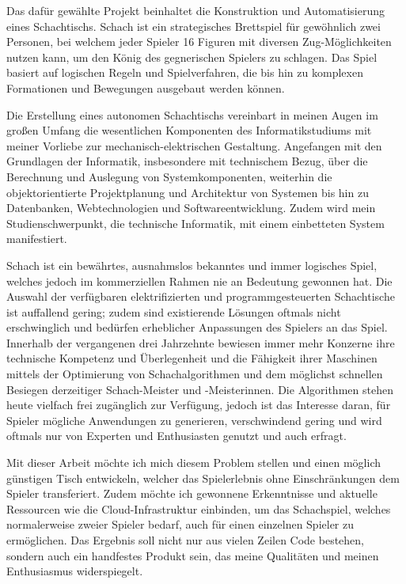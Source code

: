 Das dafür gewählte Projekt beinhaltet die Konstruktion und
Automatisierung eines Schachtischs. Schach ist ein strategisches
Brettspiel für gewöhnlich zwei Personen, bei welchem jeder Spieler 16
Figuren mit diversen Zug-Möglichkeiten nutzen kann, um den König des
gegnerischen Spielers zu schlagen. Das Spiel basiert auf logischen
Regeln und Spielverfahren, die bis hin zu komplexen Formationen und
Bewegungen ausgebaut werden können.

Die Erstellung eines autonomen Schachtischs vereinbart in meinen Augen
im großen Umfang die wesentlichen Komponenten des Informatikstudiums mit
meiner Vorliebe zur mechanisch-elektrischen Gestaltung. Angefangen mit
den Grundlagen der Informatik, insbesondere mit technischem Bezug, über
die Berechnung und Auslegung von Systemkomponenten, weiterhin die
objektorientierte Projektplanung und Architektur von Systemen bis hin zu
Datenbanken, Webtechnologien und Softwareentwicklung. Zudem wird mein
Studienschwerpunkt, die technische Informatik, mit einem einbetteten
System manifestiert.

Schach ist ein bewährtes, ausnahmslos bekanntes und immer logisches
Spiel, welches jedoch im kommerziellen Rahmen nie an Bedeutung gewonnen
hat. Die Auswahl der verfügbaren elektrifizierten und
programmgesteuerten Schachtische ist auffallend gering; zudem sind
existierende Lösungen oftmals nicht erschwinglich und bedürfen
erheblicher Anpassungen des Spielers an das Spiel. Innerhalb der
vergangenen drei Jahrzehnte bewiesen immer mehr Konzerne ihre technische
Kompetenz und Überlegenheit und die Fähigkeit ihrer Maschinen mittels
der Optimierung von Schachalgorithmen und dem möglichst schnellen
Besiegen derzeitiger Schach-Meister und -Meisterinnen. Die Algorithmen
stehen heute vielfach frei zugänglich zur Verfügung, jedoch ist das
Interesse daran, für Spieler mögliche Anwendungen zu generieren,
verschwindend gering und wird oftmals nur von Experten und Enthusiasten
genutzt und auch erfragt.

Mit dieser Arbeit möchte ich mich diesem Problem stellen und einen
möglich günstigen Tisch entwickeln, welcher das Spielerlebnis ohne
Einschränkungen dem Spieler transferiert. Zudem möchte ich gewonnene
Erkenntnisse und aktuelle Ressourcen wie die Cloud-Infrastruktur
einbinden, um das Schachspiel, welches normalerweise zweier Spieler
bedarf, auch für einen einzelnen Spieler zu ermöglichen. Das Ergebnis
soll nicht nur aus vielen Zeilen Code bestehen, sondern auch ein
handfestes Produkt sein, das meine Qualitäten und meinen Enthusiasmus
widerspiegelt.

